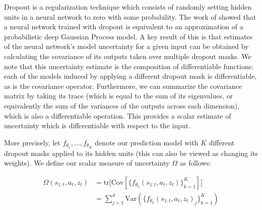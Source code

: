 \documentclass{article} %
\begin{document}
    Dropout \citep{Dropout2012, Dropout2014} is a regularization technique which consists of randomly setting hidden units in a neural network to zero with some probability.
    The work of \citep{Gal16} showed that a neural network trained with dropout is equivalent to an approximation of a probabilistic deep Gaussian Process model.
    A key result of this is that estimates of the neural network's model uncertainty for a given input can be obtained by calculating the covariance of its outputs taken over multiple dropout masks.
    We note that this uncertainty estimate is the composition of differentiable functions: each of the models induced by applying a different dropout mask is differentiable, as is the covariance operator.
    Furthermore, we can summarize the covariance matrix by taking its trace (which is equal to the sum of its eigenvalues, or equivalently the sum of the variances of the outputs across each dimension), which is also a differentiable operation. This provides a scalar estimate of uncertainty which is differentiable with respect to the input.

    More precisely, let $f_{\theta_1}, ..., f_{\theta_K}$ denote our prediction model with $K$ different dropout masks applied to its hidden units (this can also be viewed as changing its weights). We define our scalar measure of uncertainty $\Omega$ as follows:



    \begin{align*}
      \Omega(s_{1:t}, a_t, z_t) &= \mbox{tr} \Big[ \mbox{Cov} [\{ f_{\theta_k}(s_{1:t}, a_t, z_t) \}_{k=1}^K] \Big] \\
      &= \sum_{j=1}^d \mbox{Var}(\{ f_{\theta_k}(s_{1:t}, a_t, z_t)_j \}_{k=1}^K)
    \end{align*}


\end{document}
